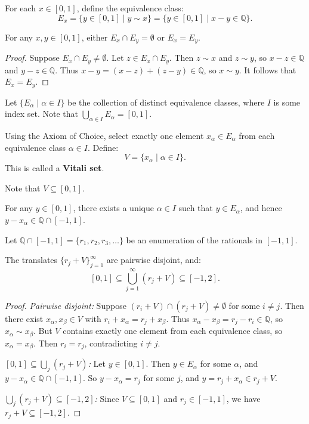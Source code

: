 \documentclass[11pt]{report}
\begin{document}
\begin{defbox}
For each $x \in [0,1]$, define the equivalence class:
\[
E_x = \{y \in [0, 1] \mid y \sim x\} = \{y \in [0, 1] \mid x - y \in \mathbb{Q}\}.
\]
\end{defbox}

\begin{propbox}
For any $x, y \in [0, 1]$, either $E_x \cap E_y = \emptyset$ or $E_x = E_y$.
\end{propbox}

\begin{proof}
Suppose $E_x \cap E_y \neq \emptyset$. Let $z \in E_x \cap E_y$. Then $z \sim x$ and $z \sim y$, so $x - z \in \mathbb{Q}$ and $y - z \in \mathbb{Q}$. Thus $x - y = (x - z) + (z - y) \in \mathbb{Q}$, so $x \sim y$. It follows that $E_x = E_y$.
\end{proof}

Let $\{E_\alpha \mid \alpha \in I\}$ be the collection of distinct equivalence classes, where $I$ is some index set. Note that $\bigcup_{\alpha \in I} E_\alpha = [0, 1]$.

\begin{defbox}
Using the Axiom of Choice, select exactly one element $x_\alpha \in E_\alpha$ from each equivalence class $\alpha \in I$. Define:
\[
V = \{x_\alpha \mid \alpha \in I\}.
\]
This is called a \textbf{Vitali set}.
\end{defbox}

Note that $V \subseteq [0, 1]$.

\begin{propbox}
For any $y \in [0, 1]$, there exists a unique $\alpha \in I$ such that $y \in E_\alpha$, and hence $y - x_\alpha \in \mathbb{Q} \cap [-1, 1]$.
\end{propbox}

Let $\mathbb{Q} \cap [-1, 1] = \{r_1, r_2, r_3, \ldots\}$ be an enumeration of the rationals in $[-1, 1]$.

\begin{propbox}
The translates $\{r_j + V\}_{j=1}^{\infty}$ are pairwise disjoint, and:
\[
[0, 1] \subseteq \bigcup_{j=1}^{\infty} (r_j + V) \subseteq [-1, 2].
\]
\end{propbox}

\begin{proof}
\textit{Pairwise disjoint:} Suppose $(r_i + V) \cap (r_j + V) \neq \emptyset$ for some $i \neq j$. Then there exist $x_\alpha, x_\beta \in V$ with $r_i + x_\alpha = r_j + x_\beta$. Thus $x_\alpha - x_\beta = r_j - r_i \in \mathbb{Q}$, so $x_\alpha \sim x_\beta$. But $V$ contains exactly one element from each equivalence class, so $x_\alpha = x_\beta$. Then $r_i = r_j$, contradicting $i \neq j$.

\textit{$[0,1] \subseteq \bigcup_j (r_j + V)$:} Let $y \in [0, 1]$. Then $y \in E_\alpha$ for some $\alpha$, and $y - x_\alpha \in \mathbb{Q} \cap [-1, 1]$. So $y - x_\alpha = r_j$ for some $j$, and $y = r_j + x_\alpha \in r_j + V$.

\textit{$\bigcup_j (r_j + V) \subseteq [-1, 2]$:} Since $V \subseteq [0, 1]$ and $r_j \in [-1, 1]$, we have $r_j + V \subseteq [-1, 2]$.
\end{proof}
\end{document}
